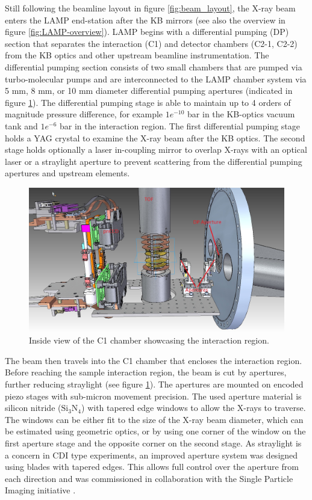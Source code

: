 Still following the beamline layout in figure \ref{fig:beam_layout}, the X-ray beam enters the LAMP end-station after the KB mirrors (see also the overview in figure \ref{fig:LAMP-overview}). LAMP begins with a differential pumping (DP) section that separates the interaction (C1) and detector chambers (C2-1, C2-2) from the KB optics and other upstream beamline instrumentation. The differential pumping section consists of two small chambers that are pumped via turbo-molecular pumps and are interconnected to the LAMP chamber system via 5 mm, 8 mm, or 10 mm diameter differential pumping apertures (indicated in figure \ref{fig:c1-ccd-spec}). The differential pumping stage is able to maintain up to 4 orders of magnitude pressure difference, for example $1e^{-10}$ bar in the KB-optics vacuum tank and $1e^{-6}$ bar in the interaction region. The first differential pumping stage holds a YAG crystal to examine the X-ray beam after the KB optics. The second stage holds optionally a laser in-coupling mirror to overlap X-rays with an optical laser or a straylight aperture to prevent scattering from the differential pumping apertures and upstream elements.\\
\begin{figure}
	\centering
		\includegraphics[width=1.00\textwidth]{images/c1-ccd-spec.jpg}
	\caption{Inside view of the C1 chamber showcasing the interaction region.}
	\label{fig:c1-ccd-spec}
\end{figure}
The beam then travels into the C1 chamber that encloses the interaction region. Before reaching the sample interaction region, the beam is cut by apertures, further reducing straylight (see figure \ref{fig:c1-ccd-spec}). The apertures are mounted on encoded piezo stages with sub-micron movement precision. The used aperture material is silicon nitride ($\text{Si}_{3}\text{N}_{4}$) with tapered edge windows to allow the X-rays to traverse. The windows can be either fit to the size of the X-ray beam diameter, which can be estimated using geometric optics, or by using one corner of the window on the first aperture stage and the opposite corner on the second stage. As straylight is a concern in CDI type experiments, an improved aperture system was designed using blades with tapered edges. This allows full control over the aperture from each direction and was commissioned in collaboration with the Single Particle Imaging initiative \citep{SPI-2015-unpublished}.\\
